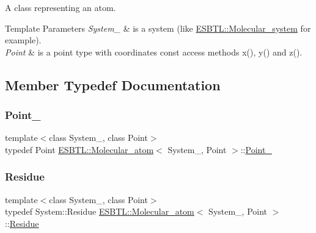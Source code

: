 A class representing an atom. 
\begin{DoxyTemplParams}{Template Parameters}
{\em System\+\_\+} & is a system (like \hyperlink{classESBTL_1_1Molecular__system}{E\+S\+B\+T\+L\+::\+Molecular\+\_\+system} for example). \\
\hline
{\em Point} & is a point type with coordinates const access methods x(), y() and z(). \\
\hline
\end{DoxyTemplParams}


\subsection{Member Typedef Documentation}
\mbox{\label{classESBTL_1_1Molecular__atom_a7803bad1194caa2c54a055a1e8f0c3fb}} 
\subsubsection{\texorpdfstring{Point\+\_}{Point\_3}}
{\footnotesize\ttfamily template$<$class System\+\_\+, class Point$>$ \\
typedef Point \hyperlink{classESBTL_1_1Molecular__atom}{E\+S\+B\+T\+L\+::\+Molecular\+\_\+atom}$<$ System\+\_\+, Point $>$\+::\hyperlink{classESBTL_1_1Molecular__atom_a7803bad1194caa2c54a055a1e8f0c3fb}{Point\+\_}}

\mbox{\label{classESBTL_1_1Molecular__atom_a24e68b497c2f43b77ca43be36af7bcd1}} 
\subsubsection{\texorpdfstring{Residue}{Residue}}
{\footnotesize\ttfamily template$<$class System\+\_\+, class Point$>$ \\
typedef System\+::\+Residue \hyperlink{classESBTL_1_1Molecular__atom}{E\+S\+B\+T\+L\+::\+Molecular\+\_\+atom}$<$ System\+\_\+, Point $>$\+::\hyperlink{classESBTL_1_1Molecular__atom_a24e68b497c2f43b77ca43be36af7bcd1}{Residue}}

